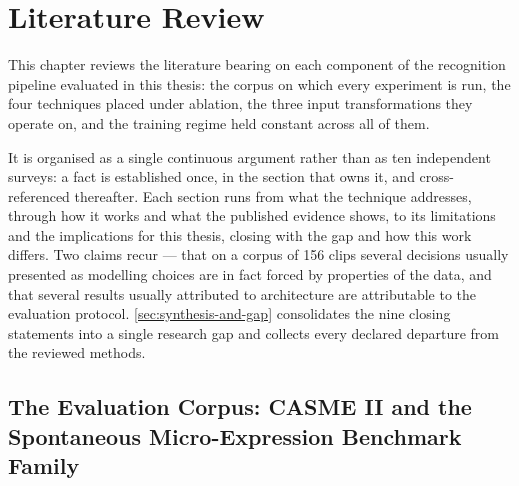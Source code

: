 %
%

\chapter{Literature Review}
\label{ch:literature}

This chapter reviews the literature bearing on each component of the recognition pipeline evaluated in this thesis: the corpus on which every experiment is run, the four techniques placed under ablation, the three input transformations they operate on, and the training regime held constant across all of them.

It is organised as a single continuous argument rather than as ten independent surveys: a fact is established once, in the section that owns it, and cross-referenced thereafter. Each section runs from what the technique addresses, through how it works and what the published evidence shows, to its limitations and the implications for this thesis, closing with the gap and how this work differs. Two claims recur --- that on a corpus of 156 clips several decisions usually presented as modelling choices are in fact forced by properties of the data, and that several results usually attributed to architecture are attributable to the evaluation protocol. \autoref{sec:synthesis-and-gap} consolidates the nine closing statements into a single research gap and collects every declared departure from the reviewed methods.


\section{The Evaluation Corpus: CASME II and the Spontaneous Micro-Expression Benchmark Family}
\label{sec:corpus}

